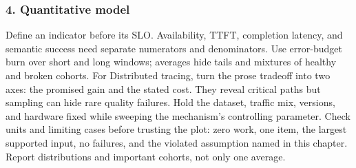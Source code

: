 \subsubsection*{4. Quantitative model}
Define an indicator before its SLO. Availability, TTFT, completion latency, and semantic success need separate numerators and denominators. Use error-budget burn over short and long windows; averages hide tails and mixtures of healthy and broken cohorts.
For Distributed tracing, turn the prose tradeoff into two axes: the promised gain and the stated cost. They reveal critical paths but sampling can hide rare quality failures. Hold the dataset, traffic mix, versions, and hardware fixed while sweeping the mechanism's controlling parameter.
Check units and limiting cases before trusting the plot: zero work, one item, the largest supported input, no failures, and the violated assumption named in this chapter. Report distributions and important cohorts, not only one average.
